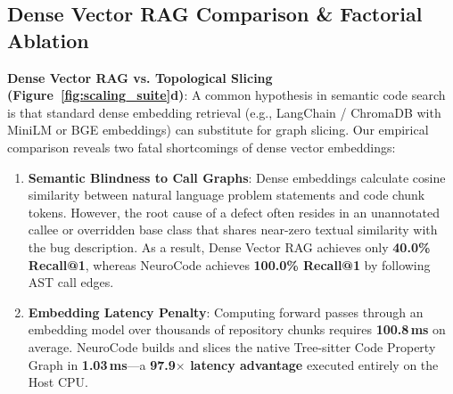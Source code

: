 \subsection{Dense Vector RAG Comparison \& Factorial Ablation}

\textbf{Dense Vector RAG vs. Topological Slicing (Figure~\ref{fig:scaling_suite}d)}: A common hypothesis in semantic code search is that standard dense embedding retrieval (e.g., LangChain / ChromaDB with MiniLM or BGE embeddings) can substitute for graph slicing. Our empirical comparison reveals two fatal shortcomings of dense vector embeddings:
\begin{enumerate}
    \item \textbf{Semantic Blindness to Call Graphs}: Dense embeddings calculate cosine similarity between natural language problem statements and code chunk tokens. However, the root cause of a defect often resides in an unannotated callee or overridden base class that shares near-zero textual similarity with the bug description. As a result, Dense Vector RAG achieves only \textbf{40.0\% Recall@1}, whereas NeuroCode achieves \textbf{100.0\% Recall@1} by following AST call edges.
    \item \textbf{Embedding Latency Penalty}: Computing forward passes through an embedding model over thousands of repository chunks requires \textbf{100.8\,ms} on average. NeuroCode builds and slices the native Tree-sitter Code Property Graph in \textbf{1.03\,ms}---a \textbf{97.9$\times$ latency advantage} executed entirely on the Host CPU.
\end{enumerate}

\begin{table}[b]
\centering
\small
{}
\caption{\textbf{Factorial Component Ablation Study.} Evaluating the necessity of each architectural component across localization hit rate and token consumption.}
\label{tab:ablation}
\end{table}

